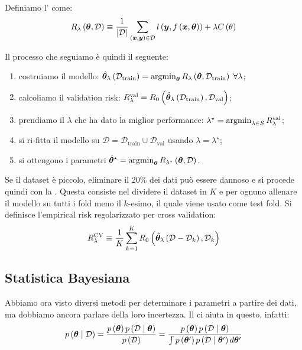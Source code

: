 \documentclass[10pt]{article}
\newcommand{\pare}[1]{
	\ensuremath{\left(#1\right)}
}
\begin{document}
\begin{definition}
Definiamo l' come:
\begin{equation}
R_\lambda\pare{\ve{\theta}, \mathcal{D}} \equiv \frac{1}{\left|\mathcal{D}\right|}\sum_{\pare{\ve{x}, \ve{y}}\in\mathcal{D}} l\pare{\ve{y}, f\pare{\ve{x}, \ve{\theta}}} + \lambda C\pare{\theta}
\end{equation}
\end{definition}
\noindent
Il processo che seguiamo è quindi il seguente:
\begin{enumerate}
\item costruiamo il modello: $\hat{\ve{\theta}}_\lambda\pare{\mathcal{D}_\text{train}} = \argmin_{\ve{\theta}} R_\lambda\pare{\ve{\theta}, \mathcal{D}_{\text{train}}}\;\forall\lambda$;
\item calcoliamo il validation risk: $R_\lambda^\text{val} = R_0\pare{\hat{\ve{\theta}}_\lambda\pare{\mathcal{D}_\text{train}}, \mathcal{D}_\text{val}}$;
\item prendiamo il \(\lambda\) che ha dato la miglior performance: \(\lambda^\star = \operatorname*{argmin}_{\lambda\in S} R_\lambda^\text{val}\);
\item si ri-fitta il modello su \(\mathcal{D} = \mathcal{D}_\text{train}\cup\mathcal{D}_\text{val}\) usando \( \lambda=\lambda^\star \);
\item si ottengono i parametri \(\hat{\ve{\theta}}^\star = \argmin_{\ve{\theta}} R_{\lambda^\star}\pare{\ve{\theta}, \mathcal{D}}\).
\end{enumerate}

    Se il dataset è piccolo, eliminare il \( 20\% \) dei dati può essere dannoso e si procede quindi con la . Questa consiste nel dividere il dataset in $K$  e per ognuno allenare il modello su tutti i fold meno il \(k\)-esimo, il quale viene usato come test fold. Si definisce l'empirical risk regolarizzato per cross validation:
    \begin{equation}
    R_\lambda^\text{CV} \equiv \frac{1}{K} \sum_{k=1}^K R_0\pare{\hat{\ve{\theta}}_\lambda\pare{\mathcal{D} - \mathcal{D}_k}, \mathcal{D}_k}
    \end{equation}

\subsection{Statistica Bayesiana}
    Abbiamo ora visto diversi metodi per determinare i parametri a partire dei dati, ma dobbiamo
    ancora parlare della loro incertezza. Il  ci aiuta in questo, infatti:
    \begin{equation}
        p\pare{\ve{\theta}\cond \mathcal{D}} = \frac{p\pare{\ve{\theta}} p\pare{\mathcal{D}\cond\ve{\theta}}}{p\pare{\mathcal{D}}} = \frac{p\pare{\ve{\theta}} p\pare{\mathcal{D}\cond\ve{\theta}}}{\int p\pare{\ve{\theta}'}p\pare{\mathcal{D}\cond\ve{\theta}'}d\ve{\theta}'}
    \end{equation}
\end{document}
